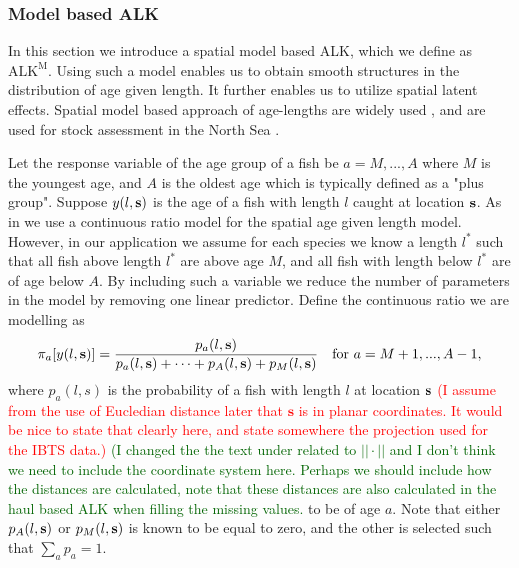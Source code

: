 \documentclass[a4paper 12pt]{article}
\numberwithin{equation}{section}
\newcommand{\ed}[1]{\textcolor{red}{#1}}
\newcommand{\olav}[1]{\textcolor{darkgreen}{#1}}
\begin{document}
\subsubsection{Model based ALK}
\label{sec:spatialModelALK}
In this section we introduce a spatial model based ALK, which we define as $\mathrm{ALK^M}$. Using such a model enables us to obtain smooth structures in the distribution of age given length. It further enables us to utilize spatial latent effects. Spatial model based approach of age-lengths are widely used \citep{berg2012spatial, hirst2012bayesian, rindorf2001analyses}, and are used for stock assessment in the North Sea \citep{berg2014evaluation}.  %

Let the response variable of the age group of a fish be $a = M,...,A$ where $M$ is the youngest age, and $A$ is the oldest age which is typically defined as a "plus group". Suppose $y(l,{\bf s})$ is the age  of a fish with length $l$ caught at location ${\bf s}$. As in \citet{berg2012spatial} we use a continuous ratio model for the spatial age given length model. However, in our application we assume for each species we know a length $l^*$ such that all fish above length $l^*$ are above age $M$, and all fish with length below $l^*$ are of age below $A$. By including such a variable we reduce the number of parameters in the model by removing one linear predictor. Define the continuous ratio we are modelling as
\begin{equation}\label{eq:linearPred1}
\pi_a[y(l,{\bf s})] = \frac{p_a(l,{\bf s})}{p_a(l,{\bf s}) + \cdots + p_{A}(l,{\bf s}) +p_{M}(l,{\bf s}) } \vspace{ 4mm} \ \ \ \text{for } a =M+1,...,A-1 ,
\end{equation}
where \vspace{-5mm} $p_a(l,s)$ is the probability of a fish with length $l$ at location ${\bf s}$ \ed{(I assume from the use of Eucledian distance later that $\mathbf{s}$ is in planar coordinates. It would be nice to state that clearly here, and state somewhere the projection used for the IBTS data.)} \olav{(I changed the the text under related to $||\cdot||$ and I don't think we need to include the coordinate system here. Perhaps we should include how the distances are calculated, note that these distances are also calculated in the haul based ALK when filling the missing values.}  to be of age $a$.  Note  that either $p_{A}(l,{\bf s})$ or $p_{M}(l,{\bf s})$ is known to be equal to zero, and the other is selected such that $\sum_a p_a = 1$. 
\end{document}

